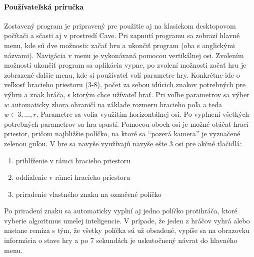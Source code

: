 \paragraph{Používateľská príručka}
Zostavený program je pripravený pre použitie aj na klasickom desktopovom počítači a sčasti aj v prostredí Cave.
Pri zapnutí programu sa zobrazí hlavné menu, kde sú dve možnosti: začať hru a ukončiť program (oba s anglickými
názvami).
Navigácia v menu je vykonávaná pomocou vertikálnej osi.
Zvolením možnosti ukončiť program sa aplikácia vypne, po zvolení možnosti začať hru je zobrazené ďalšie menu, kde si
používateľ volí parametre hry.
Konkrétne ide o veľkosť hracieho priestoru (3-8), počet za sebou idúcich znakov potrebných pre výhru a znak hráča, s
ktorým chce užívateľ hrať.
Pri voľbe parametrov sa výber $w$ automaticky zhora ohraničí na základe rozmeru hracieho poľa a teda
$w \in {3, \dots, r}$.
Parametre sa volia využitím horizontálnej osi.
Po vyplnení všetkých potrebných parametrov sa hra spustí.
Pomocou oboch osí je možné otáčať hrací priestor, pričom najbližšie políčko, na ktoré sa \enquote{pozerá kamera} je
vyznačené zelenou guľou.
V hre sa navyše využívajú navyše ešte 3 osi pre akčné tlačidlá:
\begin{enumerate}
    \item priblíženie v rámci hracieho priestoru
    \item oddialenie v rámci hracieho priestoru
    \item priradenie vlastného znaku na označené políčko
\end{enumerate}
Po priradení znaku sa automaticky vyplní aj jedno políčko protihráča, ktoré vyberie algoritmus umelej inteligencie.
V prípade, že jeden z hráčov vyhrá alebo nastane remíza s tým, že všetky políčka sú už obsadené, vypíše sa na obrazovku
informácia o stave hry a po 7 sekundách je uskutočnený návrat do hlavného menu.

